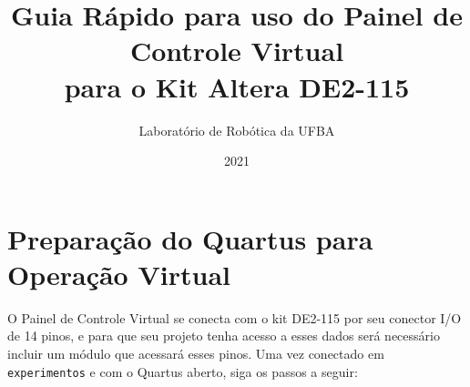 \documentclass[12pt]{article}
\begin{document}
\title{Guia Rápido para uso do Painel de Controle Virtual\\
para o Kit Altera DE2-115}

\author{Laboratório de Robótica da UFBA}

\date{2021}

\maketitle

\setcounter{page}{1} %

\section{Preparação do Quartus para Operação Virtual}
O Painel de Controle Virtual se conecta com o kit DE2-115 por seu conector I/O de 14 pinos, e para que seu projeto tenha acesso a esses dados será necessário incluir um módulo que acessará esses pinos. Uma vez conectado em \verb|experimentos| e com o Quartus aberto, siga os passos a seguir:
\end{document}
